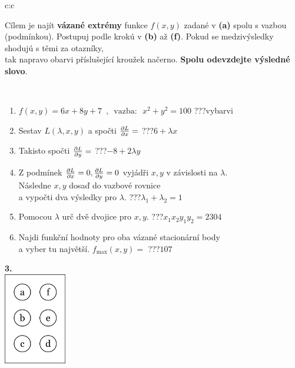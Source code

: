 \documentclass[10pt]{report}
\begin{document}
\begin{tabular}{c:c}
\begin{minipage}[c][104.5mm][t]{0.5\linewidth}
\begin{center}
\begin{minipage}{0.95\linewidth}
\begin{center}
Cílem je najít \textbf{vázané extrémy} funkce $f(x,y)$ zadané v \textbf{(a)} spolu s vazbou (podmínkou). Postupuj podle krokú v \textbf{(b)} až \textbf{(f)}. Pokud se medzivýsledky shodujú s těmi za otazníky,\\tak napravo obarvi příslušející kroužek načerno. \textbf{Spolu odevzdejte výsledné slovo}.
\end{center}
\end{minipage}
\\[1mm]
\begin{minipage}{0.79\linewidth}
\begin{center}
\begin{varwidth}{\linewidth}
\begin{enumerate}
\normalsize
\item $f(x,y)=6x+8y+7 \enspace , \enspace \mathrm{vazba:} \enspace x^2+y^2=100$\quad \dotfill\; ???\;\dotfill \quad vybarvi
\item Sestav $L(\lambda,x,y)$ a spočti $\pdv{L}{x}=$\quad \dotfill\; ???\;\dotfill \quad $6+\lambda x$
\item Takisto spočti $\pdv{L}{y}=$\quad \dotfill\; ???\;\dotfill \quad $-8+2\lambda y$
\item Z podmínek $\pdv{L}{x}=0 , \pdv{L}{y}=0$ vyjádři $x,y$ v závislosti na $\lambda$.\\ \phantom{xxxxxx}Následne $x,y$ dosaď do vazbové rovnice\\ \phantom{xxxxxx}a vypočti dva výsledky pro $\lambda$.\quad \dotfill\; ???\;\dotfill \quad $\lambda_1+\lambda_2=1$
\item Pomocou $\lambda$ urč dvě dvojice pro $x,y$.\quad \dotfill\; ???\;\dotfill \quad $x_1 x_2 y_1 y_2=2304$
\item Najdi funkční hodnoty pro oba vázané stacionární body\\ \phantom{xxxxxx}a vyber tu najvětší. $f_{\text{max}}(x,y)=$\quad \dotfill\; ???\;\dotfill \quad $107$
\end{enumerate}
\end{varwidth}
\end{center}
\end{minipage}
\begin{minipage}{0.20\linewidth}
\begin{center}
{\Huge\bfseries 3.} \\[2mm]
\includegraphics[height=40mm]{../images/braille.png}

\end{center}
\end{minipage}
\end{center}
\end{minipage}
\end{tabular}
\end{document}
